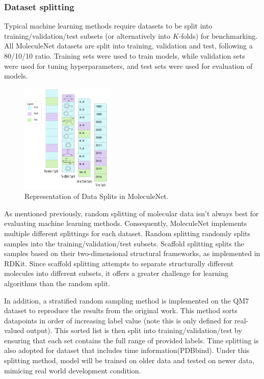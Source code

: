 \subsubsection{Dataset splitting}

Typical machine learning methods require datasets to be split into training/validation/test subsets (or alternatively into $K$-folds) for benchmarking. All MoleculeNet datasets are split into training, validation and test, following a 80/10/10 ratio. Training sets were used to train models, while validation sets were used for tuning hyperparameters, and test sets were used for evaluation of models.

\begin{figure}[h]
  \centering
  \includegraphics[width=0.4\textwidth]{Images/molnet_splits.png}
  \caption{Representation of Data Splits in MoleculeNet.}
  \label{fig:data_splits}
\end{figure}

As mentioned previously, random splitting of molecular data isn't always best for evaluating machine learning methods. Consequently, MoleculeNet implements multiple different splittings for each dataset. Random splitting randomly splits samples into the training/validation/test subsets. Scaffold splitting splits the samples based on their two-dimensional structural frameworks,\cite{scaffold} as implemented in RDKit.\cite{RDKit} Since scaffold splitting attempts to separate structurally different molecules into different subsets, it offers a greater challenge for learning algorithms than the random split.

In addition, a stratified random sampling method is implemented on the QM7 dataset to reproduce the results from the original work.\cite{GDB7_dataset_arxiv} This method sorts datapoints in order of increasing label value (note this is only defined for real-valued output). This sorted list is then split into training/validation/test by ensuring that each set contains the full range of provided labels. Time splitting is also adopted for dataset that includes time information(PDBbind). Under this splitting method, model will be trained on older data and tested on newer data, mimicing real world development condition.

